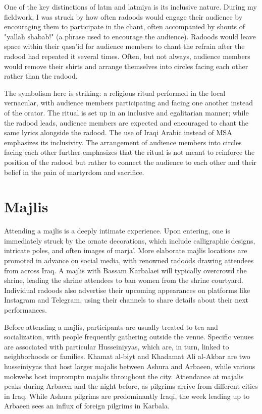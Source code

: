 One of the key distinctions of latm and latmiya is its inclusive nature. During my fieldwork, I was struck by how often radoods would engage their audience by encouraging them to participate in the chant, often accompanied by shouts of "yallah shabab!" (a phrase used to encourage the audience). Radoods would leave space within their qasa'id for audience members to chant the refrain after the radood had repeated it several times. Often, but not always, audience members would remove their shirts and arrange themselves into circles facing each other rather than the radood.

The symbolism here is striking: a religious ritual performed in the local vernacular, with audience members participating and facing one another instead of the orator. The ritual is set up in an inclusive and egalitarian manner; while the radood leads, audience members are expected and encouraged to chant the same lyrics alongside the radood. The use of Iraqi Arabic instead of MSA emphasizes its inclusivity. The arrangement of audience members into circles facing each other further emphasizes that the ritual is not meant to reinforce the position of the radood but rather to connect the audience to each other and their belief in the pain of martyrdom and sacrifice.

\section{Majlis}
Attending a majlis is a deeply intimate experience. Upon entering, one is immediately struck by the ornate decorations, which include calligraphic designs, intricate poles, and often images of marja'. More elaborate majlis locations are promoted in advance on social media, with renowned radoods drawing attendees from across Iraq. A majlis with Bassam Karbalaei will typically overcrowd the shrine, leading the shrine attendees to ban women from the shrine courtyard. Individual radoods also advertise their upcoming appearances on platforms like Instagram and Telegram, using their channels to share details about their next performances.

Before attending a majlis, participants are usually treated to tea and socialization, with people frequently gathering outside the venue. Specific venues are associated with particular Husseiniyyas, which are, in turn, linked to neighborhoods or families. Khamat al-biyt and Khadamat Ali al-Akbar are two husseiniyyas that host larger majalis between Ashura and Arbaeen, while various mokwebs host impromptu majalis throughout the city. Attendance at majalis peaks during Arbaeen and the night before, as pilgrims arrive from different cities in Iraq. While Ashura pilgrims are predominantly Iraqi, the week leading up to Arbaeen sees an influx of foreign pilgrims in Karbala.

